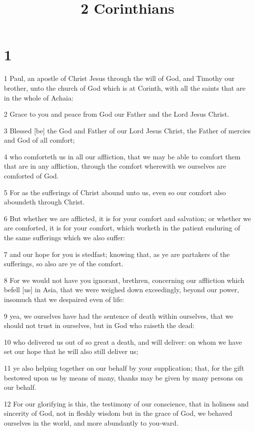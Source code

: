 

\title{2 Corinthians}

\chapter{1}

\par 1 Paul, an apostle of Christ Jesus through the will of God, and Timothy our brother, unto the church of God which is at Corinth, with all the saints that are in the whole of Achaia:
\par 2 Grace to you and peace from God our Father and the Lord Jesus Christ.
\par 3 Blessed [be] the God and Father of our Lord Jesus Christ, the Father of mercies and God of all comfort;
\par 4 who comforteth us in all our affliction, that we may be able to comfort them that are in any affliction, through the comfort wherewith we ourselves are comforted of God.
\par 5 For as the sufferings of Christ abound unto us, even so our comfort also aboundeth through Christ.
\par 6 But whether we are afflicted, it is for your comfort and salvation; or whether we are comforted, it is for your comfort, which worketh in the patient enduring of the same sufferings which we also suffer:
\par 7 and our hope for you is stedfast; knowing that, as ye are partakers of the sufferings, so also are ye of the comfort.
\par 8 For we would not have you ignorant, brethren, concerning our affliction which befell [us] in Asia, that we were weighed down exceedingly, beyond our power, insomuch that we despaired even of life:
\par 9 yea, we ourselves have had the sentence of death within ourselves, that we should not trust in ourselves, but in God who raiseth the dead:
\par 10 who delivered us out of so great a death, and will deliver: on whom we have set our hope that he will also still deliver us;
\par 11 ye also helping together on our behalf by your supplication; that, for the gift bestowed upon us by means of many, thanks may be given by many persons on our behalf.
\par 12 For our glorifying is this, the testimony of our conscience, that in holiness and sincerity of God, not in fleshly wisdom but in the grace of God, we behaved ourselves in the world, and more abundantly to you-ward.

